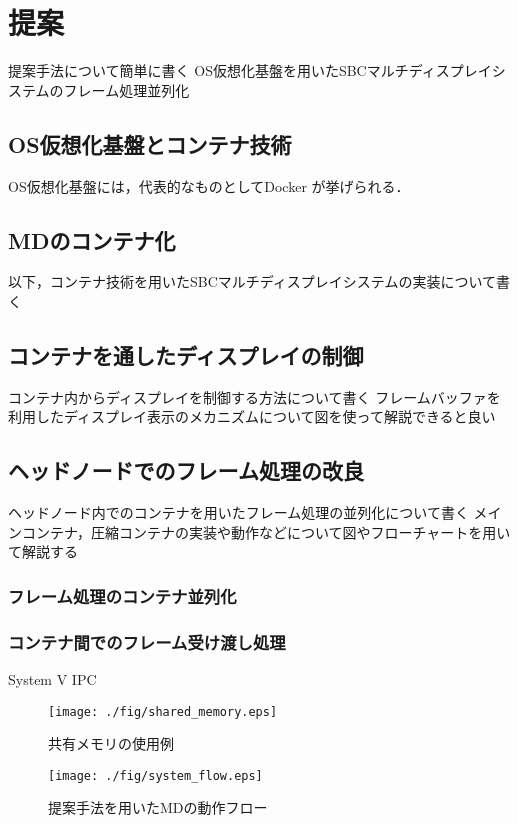 \chapter{提案}
提案手法について簡単に書く
OS仮想化基盤を用いたSBCマルチディスプレイシステムのフレーム処理並列化

\section{OS仮想化基盤とコンテナ技術}
OS仮想化基盤には，代表的なものとしてDocker \cite{docker}が挙げられる．


\section{MDのコンテナ化}
以下，コンテナ技術を用いたSBCマルチディスプレイシステムの実装について書く

\section{コンテナを通したディスプレイの制御}
コンテナ内からディスプレイを制御する方法について書く
フレームバッファを利用したディスプレイ表示のメカニズムについて図を使って解説できると良い


\section{ヘッドノードでのフレーム処理の改良}
ヘッドノード内でのコンテナを用いたフレーム処理の並列化について書く
メインコンテナ，圧縮コンテナの実装や動作などについて図やフローチャートを用いて解説する

\subsection*{フレーム処理のコンテナ並列化}
\subsection*{コンテナ間でのフレーム受け渡し処理}
System V IPC \cite{kerrisk2010linux,linux_kernel}
\begin{figure}[H]
    \hspace*{\fill}
    \texttt{[image: ./fig/shared\_memory.eps]}
    \hspace*{\fill}
    \caption{共有メモリの使用例}
   \end{figure}

\begin{figure}[H]
    \hspace*{\fill}
    \texttt{[image: ./fig/system\_flow.eps]}
    \hspace*{\fill}
    \caption{提案手法を用いたMDの動作フロー}
   \end{figure}
